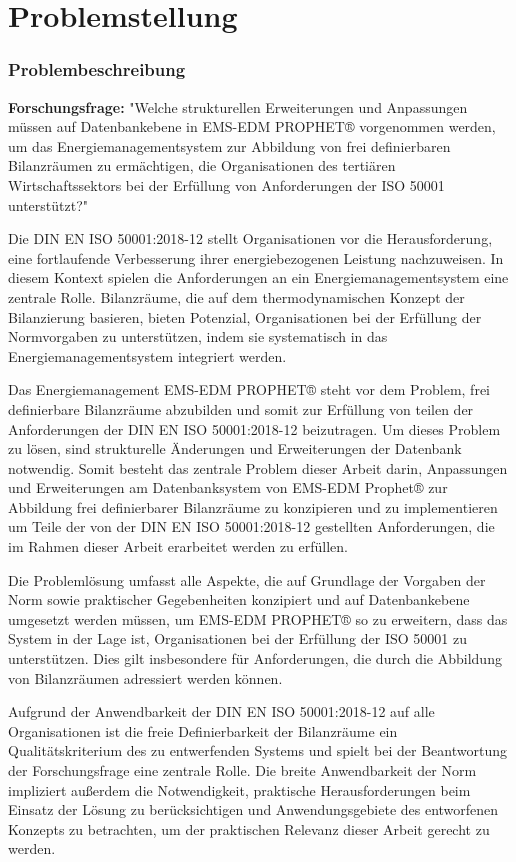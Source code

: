 \section{Problemstellung}
\subsubsection{Problembeschreibung}
\textbf{Forschungsfrage:} "Welche strukturellen Erweiterungen und Anpassungen müssen auf Datenbankebene in EMS-EDM PROPHET® vorgenommen werden, um das 
Energiemanagementsystem zur Abbildung von frei definierbaren Bilanzräumen zu ermächtigen, die Organisationen des tertiären Wirtschaftssektors bei der 
Erfüllung von Anforderungen der ISO 50001 unterstützt?"

Die DIN EN ISO 50001:2018-12 stellt Organisationen vor die Herausforderung, eine fortlaufende Verbesserung ihrer energiebezogenen Leistung nachzuweisen. 
In diesem Kontext spielen die Anforderungen an ein Energiemanagementsystem eine zentrale Rolle. Bilanzräume, die auf dem thermodynamischen Konzept der 
Bilanzierung basieren, bieten Potenzial, Organisationen bei der Erfüllung der Normvorgaben zu unterstützen, indem sie systematisch in das Energiemanagementsystem 
integriert werden.  

Das Energiemanagement EMS-EDM PROPHET® steht vor dem Problem, frei definierbare Bilanzräume abzubilden und somit zur Erfüllung von teilen der Anforderungen 
der DIN EN ISO 50001:2018-12 beizutragen.
Um dieses Problem zu lösen, sind strukturelle Änderungen und Erweiterungen der Datenbank notwendig.
Somit besteht das zentrale Problem dieser Arbeit darin, Anpassungen und Erweiterungen am Datenbanksystem von EMS-EDM Prophet® zur Abbildung 
frei definierbarer Bilanzräume zu konzipieren und zu implementieren um Teile der von der DIN EN ISO 50001:2018-12 gestellten Anforderungen, die im Rahmen dieser 
Arbeit erarbeitet werden zu erfüllen.

Die Problemlösung umfasst alle Aspekte, die auf Grundlage der Vorgaben der Norm sowie praktischer Gegebenheiten konzipiert und auf Datenbankebene 
umgesetzt werden müssen, um EMS-EDM PROPHET® so zu erweitern, dass das System in der Lage ist, Organisationen bei der Erfüllung der ISO 50001 zu 
unterstützen. Dies gilt insbesondere für Anforderungen, die durch die Abbildung von Bilanzräumen adressiert werden können.

Aufgrund der Anwendbarkeit der DIN EN ISO 50001:2018-12 auf alle Organisationen ist die freie Definierbarkeit der Bilanzräume ein Qualitätskriterium des zu 
entwerfenden Systems und spielt bei der Beantwortung der Forschungsfrage eine zentrale Rolle.
Die breite Anwendbarkeit der Norm impliziert außerdem die Notwendigkeit, praktische Herausforderungen beim Einsatz der Lösung zu berücksichtigen und 
Anwendungsgebiete des entworfenen Konzepts zu betrachten, um der praktischen Relevanz dieser Arbeit gerecht zu werden.

